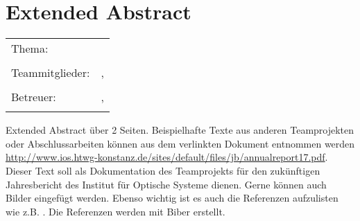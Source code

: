 \chapter*{Extended Abstract}

\begin{center}
	\begingroup
	\renewcommand*{\arraystretch}{1}
	{\makeatletter	
		\begin{tabular}{p{3.2cm}p{9.6cm}}
			Thema: & \thema \\
			& \\
			Teammitglieder: & \verfasserA, \verfasserB \\
			& \\
			Betreuer: & \hoschschule \newline \institut \newline \prueferA, \prueferB \\
			& \\
		\end{tabular}
		
		\makeatother}
	\endgroup
\end{center}

\bigskip

\noindent
Extended Abstract über 2 Seiten. Beispielhafte Texte aus anderen Teamprojekten oder Abschlussarbeiten können aus dem verlinkten Dokument entnommen werden \href{http://www.ios.htwg-konstanz.de/sites/default/files/jb/annualreport17.pdf}{http://www.ios.htwg-konstanz.de/sites/default/files/jb/annualreport17.pdf}.\\

\noindent Dieser Text soll als Dokumentation des Teamprojekts für den zukünftigen Jahresbericht des Institut für Optische Systeme dienen. Gerne können auch Bilder eingefügt werden. Ebenso wichtig ist es auch die Referenzen aufzulisten wie z.B. \cite{Geim2001}. Die Referenzen werden mit Biber erstellt.


\printbibliography[title={Referenzen}, heading=subbibliography]

